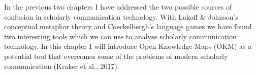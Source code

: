In the previous two chapters I have addressed the two possible sources of confusion in scholarly communication technology. With Lakoff & Johnson’s conceptual metaphor theory and Coeckelbergh’s language games we have found two interesting tools which we can use to analyse scholarly communication technology. In this chapter I will introduce Open Knowledge Maps (OKM) as a potential tool that overcomes some of the problems of modern scholarly communication (Kraker et al., 2017).
